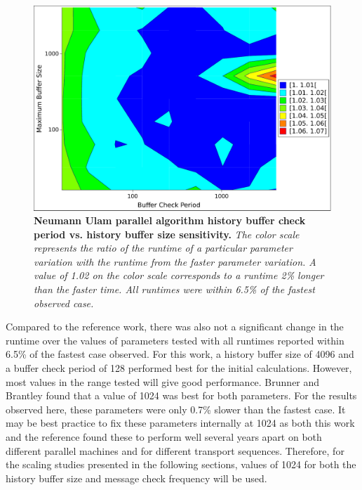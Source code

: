 \begin{figure}[t!]
  \begin{center}
    \includegraphics[width=5.0in]{chapters/parallel_mc/titan_comm_parameters.pdf}
  \end{center}
  \caption{\textbf{Neumann Ulam parallel algorithm history buffer
      check period vs. history buffer size sensitivity.} \textit{The
      color scale represents the ratio of the runtime of a particular
      parameter variation with the runtime from the faster parameter
      variation. A value of 1.02 on the color scale corresponds to a
      runtime 2\% longer than the faster time. All runtimes were
      within 6.5\% of the fastest observed case.}}
  \label{fig:titan_comm_parameters}
\end{figure}

Compared to the reference work, there was also not a significant
change in the runtime over the values of parameters tested with all
runtimes reported within 6.5\% of the fastest case observed. For this
work, a history buffer size of 4096 and a buffer check period of 128
performed best for the initial calculations. However, most values in
the range tested will give good performance. Brunner and Brantley
found that a value of 1024 was best for both parameters. For the
results observed here, these parameters were only 0.7\% slower than
the fastest case. It may be best practice to fix these parameters
internally at 1024 as both this work and the reference found these to
perform well several years apart on both different parallel machines
and for different transport sequences. Therefore, for the scaling
studies presented in the following sections, values of 1024 for both
the history buffer size and message check frequency will be used.

